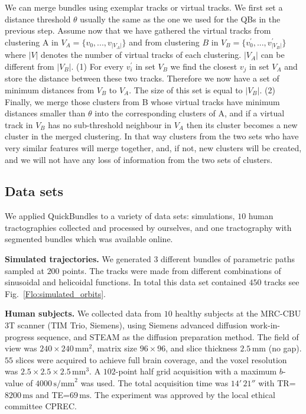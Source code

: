 \documentclass[preprint,authoryear,a4paper,10pt,onecolumn]{elsarticle}
\begin{document}
We can merge bundles using exemplar tracks or virtual tracks. We first
set a distance threshold $\theta$ usually the same as the one we used
for the QBs in the previous step. Assume now that we have gathered the
virtual tracks from clustering A in $V_{A}=\{v_{0},...,v_{|V_{A}|}\}$
and from clustering $B$ in $V_{B}=\{v_{0}^{'},...,v_{|V_{B}|}^{'}\}$
where $|V|$ denotes the number of virtual tracks of each clustering.
$|V_{A}|$ can be different from $|V_{B}|$. (1) For every $v_{i}^{'}$ in set
$V_{B}$ we find the closest $v_{j}$ in set $V_{A}$ and store the
distance between these two tracks. Therefore we now have a set of
minimum distances from $V_{B}$ to $V_{A}$. The size of this set is equal
to $|V_{B}|$. (2) Finally, we merge those clusters from B whose virtual
tracks have minimum distances smaller than $\theta$ into the
corresponding clusters of A, and if a virtual track in $V_{B}$ has no
sub-threshold neighbour in $V_{A}$ then its cluster becomes a new
cluster in the merged clustering. In that way clusters from the two sets
who have very similar features will merge together, and, if not, new
clusters will be created, and we will not have any loss of information
from the two sets of clusters.

\subsection{\label{sub:QB-Data-sets}Data sets}

We applied QuickBundles to a variety of data sets: simulations, $10$ human
tractographies collected and processed by ourselves, and one tractography
with segmented bundles which was available online.

\textbf{Simulated trajectories.} We generated $3$ different bundles of
parametric paths sampled at $200$ points. The tracks were made from
different combinations of sinusoidal and helicoidal functions.  In total
this data set contained $450$ tracks see Fig.~\ref{Flo:simulated_orbits}.

\textbf{Human subjects.} We collected data from $10$ healthy subjects at
the MRC-CBU 3T scanner (TIM Trio, Siemens), using Siemens advanced
diffusion work-in-progress sequence, and STEAM
\citep{merboldt1992diffusion,MAB04} as the diffusion preparation
method. The field of view was $240\times240\,\textrm{mm}^{2}$, matrix size
$96\times96$, and slice thickness $2.5\,\textrm{mm}$ (no gap).  $55$ slices were
acquired to achieve full brain coverage, and the voxel resolution was
$2.5\times2.5\times2.5\,\textrm{mm}^{3}$. A $102$-point half grid
acquisition \citep{Yeh2010} with a maximum $b$-value of $4000\, \textrm{s/mm}^{2}$
was used. The total acquisition time was $14'\,21''$ with
TR=$8200\,\textrm{ms}$ and TE=$69\,\textrm{ms}$. The experiment was approved
by the local ethical committee CPREC.
\end{document}
